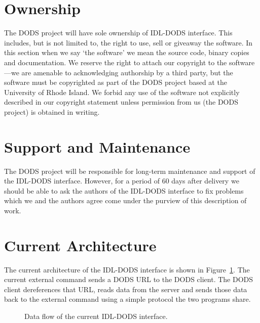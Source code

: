 \documentclass[12pt]{article}
\begin{document}
\section{Ownership}

The DODS project will have sole ownership of IDL-DODS interface. This
includes, but is not limited to, the right to use, sell or giveaway the
software. In this section when we say `the software' we mean the source code,
binary copies and documentation. We reserve the right to attach our copyright
to the software---we are amenable to acknowledging authorship by a third
party, but the software must be copyrighted as part of the DODS project based
at the University of Rhode Island. We forbid any use of the software not
explicitly described in our copyright statement unless permission from us
(the DODS project) is obtained in writing.

\section{Support and Maintenance}

The DODS project will be responsible for long-term maintenance and support of
the IDL-DODS interface. However, for a period of 60 days after delivery we
should be able to ask the authors of the IDL-DODS interface to fix problems
which we and the authors agree come under the purview of this description of
work. 

\appendix

\section{Current Architecture}
\label{current-arch}

The current architecture of the IDL-DODS interface is shown in
Figure~\ref{data-flow}. The current external command sends a DODS URL to the
DODS client. The DODS client dereferences that URL, reads data from the
server and sends those data back to the external command using a simple
protocol the two programs share.

\begin{figure}
\caption{Data flow of the current IDL-DODS interface.}
\label{data-flow}
\end{figure}
\end{document}
